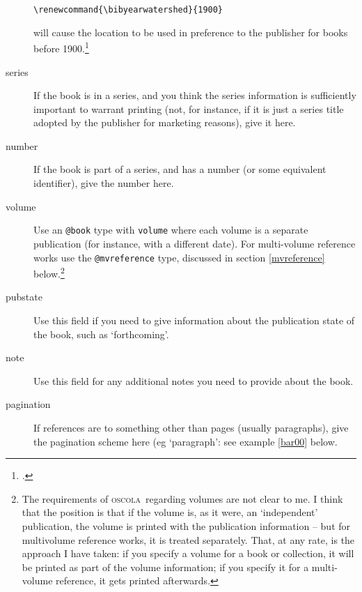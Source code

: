 \documentclass[a5paper,fontsize=9pt,DIV=1]{scrartcl}
\newcommand{\oscolashort}{\textsc{oscola}\nocite{oscola}}
\begin{document}
\begin{description}
\begin{verbatim}
\renewcommand{\bibyearwatershed}{1900}
  \end{verbatim}will
  cause the location to be used in preference to the publisher for
  books before 1900.\footcite[35]{oscola}
\item[series]
  If the book is in a series, and you think the series
  information is sufficiently important to warrant printing (not, for
  instance, if it is just a series title adopted by the publisher for
  marketing reasons), give it here. 
\item[number]
  If the book is part of a series, and has a number (or
  some equivalent identifier), give the number here.
\item[volume]
  Use an \texttt{@book} type with \texttt{volume} where
  each volume is a separate publication (for instance, with a
  different date). For multi-volume reference works use the
  \texttt{@mvreference} type, discussed in section \ref{mvreference} below.\footnote{The requirements of \oscolashort\ regarding volumes are not clear to me. I think that the position is that if the volume is, as it were, an `independent' publication, the volume is printed with the publication information -- but for multivolume reference works, it is treated separately. That, at any rate, is the approach I have taken: if you specify a volume for a book or collection, it will be printed as part of the volume information; if you specify it for a multi-volume reference, it gets printed afterwards.}
\item[pubstate] Use this field if you need to give information about
  the publication state of the book, such as `forthcoming'.
\item[note]
  Use this field for any additional notes you need to
  provide about the book.
\item[pagination]
  If references are to something other than pages
  (usually paragraphs), give the pagination scheme here (eg
  `paragraph': see example \ref{bar00} below.
\end{description}
\end{document}

